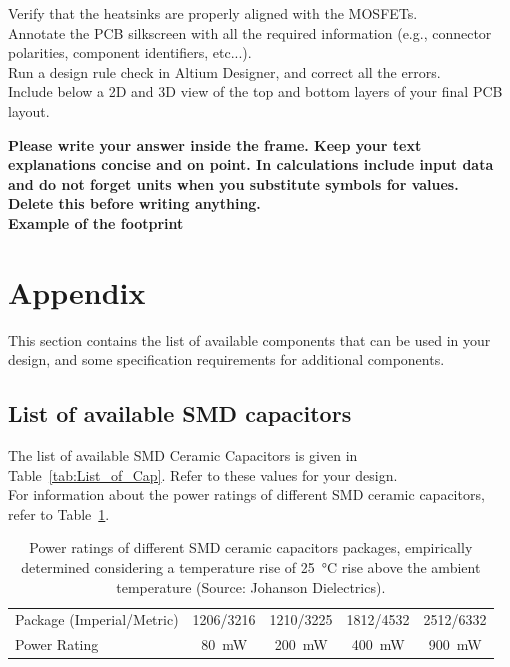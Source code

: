 \documentclass{PELsmallreport}
\begin{document}
Verify that the heatsinks are properly aligned with the MOSFETs.\\

Annotate the PCB silkscreen with all the required information (e.g., connector polarities, component identifiers, etc...).\\

Run a design rule check in Altium Designer, and correct all the errors. \\

Include below a 2D and 3D view of the top and bottom layers of your final PCB layout.\\
\begin{framed}
	\vspace{2em}
	\textbf{Please write your answer inside the frame. Keep your text explanations concise and on point. In calculations include input data and do not forget units when you substitute symbols for values. \\ Delete this before writing anything.\\ Example of the footprint}
	\vspace{2em}
\end{framed}
\hfill{}

\clearpage

\section*{Appendix}

This section contains the list of available components that can be used in your design, and some specification requirements for additional components.  

\subsection*{List of available SMD capacitors}

The list of available SMD Ceramic Capacitors is given in Table~\ref{tab:List_of_Cap}.
Refer to these values for your design. \\
For information about the power ratings of different SMD ceramic capacitors, refer to Table~\ref{tab:Ceramic_cap_power_rating}. 

\begin{table}[H]
	\centering
	\captionsetup{justification=centering}
	\caption{Power ratings of different SMD ceramic capacitors packages, empirically determined considering a temperature rise of \SI{25}{\celsius} rise above the ambient temperature (Source: Johanson Dielectrics).}
	\label{tab:Ceramic_cap_power_rating}
    \begin{tabular}{l|c|c|c|c}
    \hline
    Package (Imperial/Metric) & 1206/3216   & 1210/3225   & 1812/4532   & 2512/6332   \\
    Power Rating             & \SI{80}{\milli \watt}     & \SI{200}{\milli \watt}    & \SI{400}{\milli \watt}    & \SI{900}{\milli \watt} \\
    \hline
\end{tabular}
\end{table}
\end{document}

